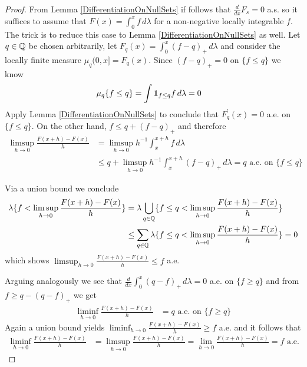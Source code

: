 \begin{proof}
From Lemma \ref{DifferentiationOnNullSets} if follows that $\frac{d}{dx} F_s = 0$ a.s. so it suffices to assume that
$F(x) = \int_0^x f \, d\lambda$ for a non-negative locally integrable $f$.   The trick is to reduce this case to  Lemma \ref{DifferentiationOnNullSets} as well.  
Let $q \in \mathbb{Q}$ be
chosen arbitrarily, let $F_q(x) = \int_0^x (f-q)_+ \, d\lambda$ and consider the locally finite
measure $\mu_q(0,x] = F_q(x)$.  Since $(f-q)_+ = 0$ on $\lbrace f \leq q \rbrace$ we know
\begin{align*}
\mu_q \lbrace f \leq q \rbrace &= \int \textbf{1}_{f \leq q} f \, d\lambda = 0
\end{align*}
Apply Lemma \ref{DifferentiationOnNullSets} to conclude that $F^\prime_q(x) = 0$ a.e. on $\lbrace f \leq q \rbrace$.
On the other hand, $f \leq q + (f-q)_+$ and therefore
\begin{align*}
\limsup_{h \to 0} \frac{F(x+h) - F(x)}{h} &= \limsup_{h \to 0} h^{-1} \int_x^{x+h} f \, d\lambda \\
&\leq q + \limsup_{h \to 0} h^{-1} \int_x^{x+h} (f-q)_+ \, d\lambda = q \text{ a.e. on $\lbrace f \leq q \rbrace$}
\end{align*}

Via a union bound we conclude
\begin{align*}
\lambda \lbrace f < \limsup_{h \to 0} \frac{F(x+h) - F(x)}{h} \rbrace &= \lambda \bigcup_{q \in \mathbb{Q}} \lbrace  f \leq q < \limsup_{h \to 0} \frac{F(x+h) - F(x)}{h} \rbrace \\
&\leq \sum_{q \in \mathbb{Q}} \lambda \lbrace  f \leq q < \limsup_{h \to 0} \frac{F(x+h) - F(x)}{h} \rbrace = 0
\end{align*}
which shows $\limsup_{h \to 0} \frac{F(x+h) - F(x)}{h} \leq f$ a.e.

Arguing analogously we see that $\frac{d}{dx} \int_0^x (q - f)_+ \, d\lambda=0$ a.e. on $\lbrace f \geq q \rbrace$ and from $f \geq q - (q - f)_+$ we get
\begin{align*}
\liminf_{h \to 0} \frac{F(x+h) - F(x)}{h} &= q \text{ a.e. on $\lbrace f \geq q \rbrace$}
\end{align*}
Again a union bound yields $\liminf_{h \to 0} \frac{F(x+h) - F(x)}{h} \geq f$ a.e.  and it follows that
\begin{align*}
\liminf_{h \to 0} \frac{F(x+h) - F(x)}{h} &= \limsup_{h \to 0} \frac{F(x+h) - F(x)}{h} = \lim_{h \to 0} \frac{F(x+h) - F(x)}{h} = f \text{ a.e.}
\end{align*}
\end{proof}


